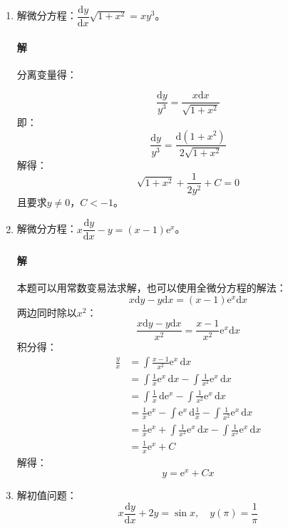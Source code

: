 \documentclass[fontset=none,openany,a4paper]{ctexbook}
\begin{document}
\begin{enumerate}

    \item 解微分方程：$\dfrac{\mathrm{d}y}{\mathrm{d}x}\sqrt{1+x^2}=xy^3$。

    \paragraph{解} 分离变量得：

    \[
    \frac{\mathrm{d}y}{y^3} = \frac{x\mathrm{d}x}{\sqrt{1+x^2}}
    \]
    即：
    \[
    \frac{\mathrm{d}y}{y^3} = \frac{\mathrm{d}(1+x^2)}{2\sqrt{1+x^2}}
    \]
    解得：
    \[
    \sqrt{1+x^2} + \frac{1}{2y^2}+C = 0
    \]
    且要求$y\neq0$，$C<-1$。

    \item 解微分方程：$x\dfrac{\mathrm{d}y}{\mathrm{d}x}-y=(x-1)\mathrm{e}^x$。

    \paragraph{解}

    本题可以用常数变易法求解，也可以使用全微分方程的解法：
    \[
    x\mathrm{d}y - y\mathrm{d}x = (x-1)\mathrm{e}^x\mathrm{d}x
    \]
    两边同时除以$x^2$：
    \[
    \frac{x\mathrm{d}y - y\mathrm{d}x}{x^2} = \frac{x-1}{x^2}\mathrm{e}^x\mathrm{d}x
    \]
    积分得：
    \begin{align*}
        \frac{y}{x}
        &= \int \frac{x-1}{x^2}\mathrm{e}^x\,\mathrm{d}x \\
        &= \int \frac{1}{x}\mathrm{e}^x\,\mathrm{d}x - \int \frac{1}{x^2}\mathrm{e}^x\,\mathrm{d}x \\
        &= \int \frac{1}{x}\,\mathrm{d}\mathrm{e}^x - \int \frac{1}{x^2}\mathrm{e}^x\,\mathrm{d}x \\
        &= \frac{1}{x}\mathrm{e}^x - \int \mathrm{e}^x\,\mathrm{d}\frac{1}{x} - \int \frac{1}{x^2}\mathrm{e}^x\,\mathrm{d}x \\
        &= \frac{1}{x}\mathrm{e}^x + \int \frac{1}{x^2}\mathrm{e}^x\,\mathrm{d}x - \int \frac{1}{x^2}\mathrm{e}^x\,\mathrm{d}x \\
        &= \frac{1}{x}\mathrm{e}^x + C
    \end{align*}
    解得：
    \[
    y = \mathrm{e}^x + Cx
    \]

    \item 解初值问题：
    \[
    x\frac{\mathrm{d}y}{\mathrm{d}x} + 2y = \sin x,\quad y(\pi) = \frac{1}{\pi}
    \]


\end{enumerate}
\end{document}
